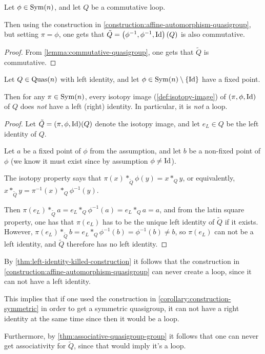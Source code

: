 \begin{corollary} \label{corollary:construction-symmetric}
    Let \( \phi \in \operatorname{Sym}(n) \), and let \( Q \) be a commutative loop.

    Then using the construction in \autoref{construction:affine-automorphism-quasigroup}, but setting \( \pi = \phi \), one gets that \( \tilde{Q} = \left( \phi^{-1}, \phi^{-1}, \operatorname{Id} \right)(Q) \) is also commutative.
\end{corollary}
\begin{proof}
    From \autoref{lemma:commutative-quasigroup}, one gets that \( \tilde{Q} \) is commutative.
\end{proof}

\begin{theorem} \label{thm:left-identity-killed-construction}
    Let \( Q \in \operatorname{Quas}(n) \) with left identity, and let \( \phi \in \operatorname{Sym}(n) \setminus \{\operatorname{Id}\} \) have a fixed point.

    Then for any \( \pi \in \operatorname{Sym}(n) \), every isotopy image (\autoref{def:isotopy-image}) of \( (\pi, \phi, \operatorname{Id}) \) of \( Q \) does \emph{not} have a left (right) identity. In particular, it is \emph{not} a loop.
\end{theorem}
\begin{proof}
    Let \( \tilde{Q} = (\pi, \phi, \operatorname{Id})(Q) \) denote the isotopy image, and let \( e_L \in Q \) be the left identity of \( Q \). 
    
    Let \( a \) be a fixed point of \( \phi \) from the assumption, and let \( b \) be a non-fixed point of \( \phi \) (we know it must exist since by assumption \( \phi \neq \operatorname{Id} \)).

    The isotopy property says that \( \pi(x) *_{\tilde{Q}} \phi(y) = x *_Q y \), or equivalently, \( x *_{\tilde{Q}} y = \pi^{-1}(x) *_Q \phi^{-1}(y) \).

    Then \( \pi(e_L) *_{\tilde{Q}} a = e_L *_Q \phi^{-1}(a) = e_L *_Q a = a \), and from the latin square property, one has that \( \pi(e_L) \) has to be the unique left identity of \( \tilde{Q} \) if it exists. However, \( \pi(e_L) *_{\tilde{Q}} b = e_L *_Q \phi^{-1}(b) = \phi^{-1}(b) \neq b \), so \( \pi(e_L) \) can not be a left identity, and \( \tilde{Q} \) therefore has no left identity.
\end{proof}

\begin{remark} \label{remark:left-identity-killed}
    By \autoref{thm:left-identity-killed-construction} it follows that the construction in \autoref{construction:affine-automorphism-quasigroup} can never create a loop, since it can not have a left identity.

    This implies that if one used the construction in \autoref{corollary:construction-symmetric} in order to get a symmetric quasigroup, it can not have a right identity at the same time since then it would be a loop.

    Furthermore, by \autoref{thm:associative-quasigroup-group} it follows that one can never get associativity for \( \tilde{Q} \), since that would imply it's a loop.
\end{remark}

